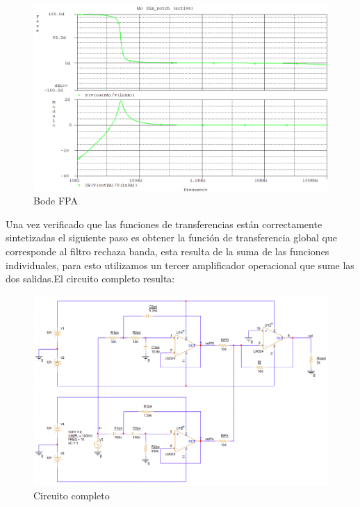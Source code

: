 \documentclass[12pt]{article}
\begin{document}
	\begin{figure}[h!]
		\includegraphics[width=1\linewidth]{Imagenes/Bode_FPA}
		\caption[Bode FPA]{Bode FPA}
		\label{fig:bodefpa}
	\end{figure}
	
	Una vez verificado que las funciones de transferencias están correctamente sintetizadas el siguiente paso es obtener la función de transferencia global que corresponde al filtro rechaza banda, esta resulta de la suma de las funciones individuales, para esto utilizamos un tercer amplificador operacional que sume las dos salidas.El circuito completo resulta:
	\begin{figure}[h!]
		\includegraphics[width=1\linewidth]{Imagenes/Circuito_Completo}
		\caption[Circuito completo]{Circuito completo}
		\label{fig:circuitocompleto}
	\end{figure}
	
\end{document}
